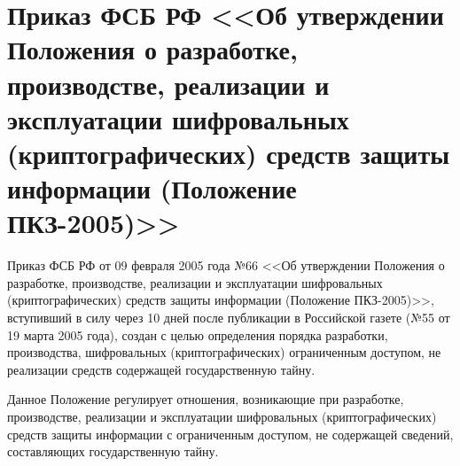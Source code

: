 \section{Приказ ФСБ РФ <<Об утверждении Положения о разработке, производстве, реализации и эксплуатации шифровальных (криптографических) средств защиты информации (Положение ПКЗ-2005)>>} \label{rights_fsb_66}

Приказ ФСБ РФ от 09 февраля 2005 года №66 <<Об утверждении Положения о разработке, производстве, реализации и эксплуатации шифровальных (криптографических) средств защиты информации (Положение ПКЗ-2005)>>, вступивший в силу через 10 дней после публикации в Российской газете (№55 от 19 марта 2005 года), создан с целью определения порядка разработки, производства, шифровальных (криптографических) ограниченным доступом, не реализации средств содержащей государственную тайну.

\vspace{\baselineskip}
Данное Положение регулирует отношения, возникающие при разработке, производстве, реализации и эксплуатации шифровальных (криптографических) средств защиты информации с ограниченным доступом, не содержащей сведений, составляющих государственную тайну.


